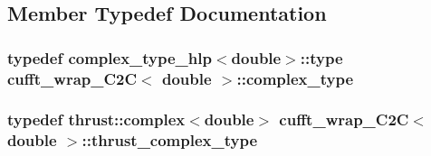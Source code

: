 \subsection{Member Typedef Documentation}
\hypertarget{classcufft__wrap__C2C_3_01double_01_4_a6813a47168c043bdbf7ca39cb44e16ca}{
\subsubsection[{complex\-\_\-type}]{\setlength{\rightskip}{0pt plus 5cm}typedef {\bf complex\-\_\-type\-\_\-hlp}$<$double$>$\-::type {\bf cufft\-\_\-wrap\-\_\-\-C2\-C}$<$ double $>$\-::{\bf complex\-\_\-type}}}\label{classcufft__wrap__C2C_3_01double_01_4_a6813a47168c043bdbf7ca39cb44e16ca}
\hypertarget{classcufft__wrap__C2C_3_01double_01_4_a61adb083b7093ac3b77aea1e52f85107}{
\subsubsection[{thrust\-\_\-complex\-\_\-type}]{\setlength{\rightskip}{0pt plus 5cm}typedef {\bf thrust\-::complex}$<$double$>$ {\bf cufft\-\_\-wrap\-\_\-\-C2\-C}$<$ double $>$\-::{\bf thrust\-\_\-complex\-\_\-type}}}\label{classcufft__wrap__C2C_3_01double_01_4_a61adb083b7093ac3b77aea1e52f85107}


